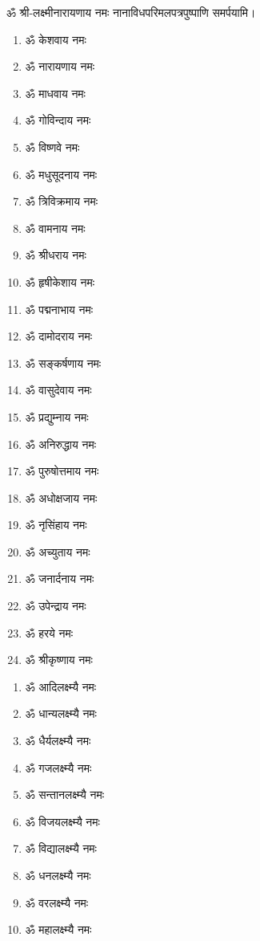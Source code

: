 \begin{center}
ॐ श्री-लक्ष्मीनारायणाय नमः नानाविधपरिमलपत्रपुष्पाणि समर्पयामि। \medskip

\clearpage
{}

\begin{multicols}{2}
\begin{enumerate}
\item ॐ केशवाय नमः
\item ॐ नारायणाय नमः
\item ॐ माधवाय नमः
\item ॐ गोविन्दाय नमः
\item ॐ विष्णवे नमः 
\item ॐ मधुसूदनाय नमः
\item ॐ त्रिविक्रमाय नमः
\item ॐ वामनाय नमः
\item ॐ श्रीधराय नमः
\item ॐ हृषीकेशाय नमः
\item ॐ पद्मनाभाय नमः
\item ॐ दामोदराय नमः
\item ॐ सङ्कर्षणाय नमः
\item ॐ वासुदेवाय नमः
\item ॐ प्रद्युम्नाय नमः
\item ॐ अनिरुद्धाय नमः
\item ॐ पुरुषोत्तमाय नमः
\item ॐ अधोक्षजाय नमः
\item ॐ नृसिंहाय नमः
\item ॐ अच्युताय नमः
\item ॐ जनार्दनाय नमः
\item ॐ उपेन्द्राय नमः 
\item ॐ हरये नमः
\item ॐ श्रीकृष्णाय नमः
\end{enumerate}
\end{multicols}


\begin{multicols}{2}
\begin{enumerate}
\item ॐ आदिलक्ष्म्यै नमः
\item ॐ धान्यलक्ष्म्यै नमः
\item ॐ धैर्यलक्ष्म्यै नमः
\item ॐ गजलक्ष्म्यै नमः
\item ॐ सन्तानलक्ष्म्यै नमः
\item ॐ विजयलक्ष्म्यै नमः
\item ॐ विद्यालक्ष्म्यै नमः
\item ॐ धनलक्ष्म्यै नमः
\item ॐ वरलक्ष्म्यै नमः
\item ॐ महालक्ष्म्यै नमः 
\end{enumerate}
\end{multicols}


\end{center}
